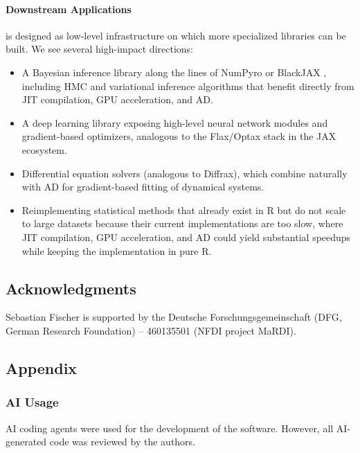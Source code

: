 \paragraph{Downstream Applications}\label{downstream-applications}

 is designed as low-level infrastructure on which more specialized libraries can be built.
We see several high-impact directions:

\begin{itemize}
\tightlist
\item
  A Bayesian inference library along the lines of NumPyro \citep{ref-numpyro} or BlackJAX \citep{ref-blackjax}, including HMC and variational inference algorithms that benefit directly from JIT compilation, GPU acceleration, and AD.
\item
  A deep learning library exposing high-level neural network modules and gradient-based optimizers, analogous to the Flax/Optax stack in the JAX ecosystem.
\item
  Differential equation solvers (analogous to Diffrax), which combine naturally with AD for gradient-based fitting of dynamical systems.
\item
  Reimplementing statistical methods that already exist in R but do not scale to large datasets because their current implementations are too slow, where JIT compilation, GPU acceleration, and AD could yield substantial speedups while keeping the implementation in pure R.
\end{itemize}

\subsection{Acknowledgments}\label{acknowledgments}

Sebastian Fischer is supported by the Deutsche Forschungsgemeinschaft (DFG, German Research Foundation) -- 460135501 (NFDI project MaRDI).

\subsection{Appendix}\label{appendix}

\subsubsection{AI Usage}\label{ai-usage}

AI coding agents were used for the development of the software.
However, all AI-generated code was reviewed by the authors.

